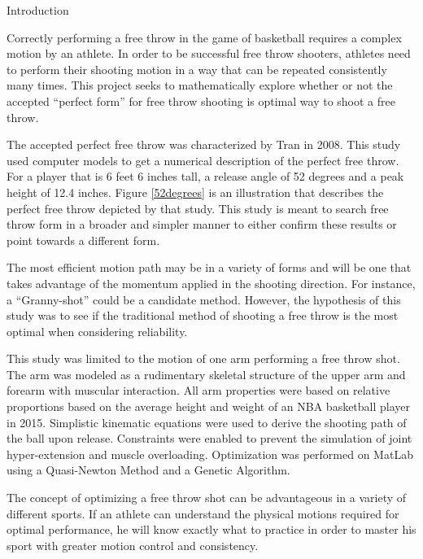 


\begin{center}
\Large Introduction
\end{center}


\begin{multicols}{2}
Correctly performing a free throw in the game of basketball requires a complex motion by an athlete. In order to be successful free throw shooters, athletes need to perform their shooting motion in a way that can be repeated consistently many times. This project seeks to mathematically explore whether or not the accepted “perfect form” for free throw shooting is optimal way to shoot a free throw.

The accepted perfect free throw was characterized by Tran in 2008. This study used computer models to get a numerical description of the perfect free throw. For a player that is 6 feet 6 inches tall, a release angle of 52 degrees and a peak height of 12.4 inches. Figure \ref{52degrees} is an illustration that describes the perfect free throw depicted by that study. This study is meant to search free throw form in a broader and simpler manner to either confirm these results or point towards a different form.


The most efficient motion path may be in a variety of forms and will be one that takes advantage of the momentum applied in the shooting direction.  For instance, a “Granny-shot” could be a candidate method.  However, the hypothesis of this study was to see if the traditional method of shooting a free throw is the most optimal when considering reliability. 

This study was limited to the motion of one arm performing a free throw shot.  The arm was modeled as a rudimentary skeletal structure of the upper arm and forearm with muscular interaction.  All arm properties were based on relative proportions based on the average height and weight of an NBA basketball player in 2015.  Simplistic kinematic equations were used to derive the shooting path of the ball upon release.  Constraints were enabled to prevent the simulation of joint hyper-extension and muscle overloading.  Optimization was performed on MatLab using a Quasi-Newton Method and a Genetic Algorithm.

The concept of optimizing a free throw shot can be advantageous in a variety of different sports.  If an athlete can understand the physical motions required for optimal performance, he will know exactly what to practice in order to master his sport with greater motion control and consistency. 

\end{multicols}


